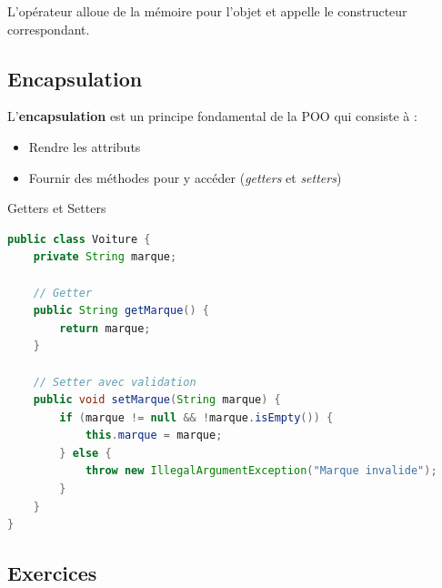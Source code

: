 \begin{remarque}
    L'opérateur  alloue de la mémoire pour l'objet et appelle le constructeur correspondant.
\end{remarque}


\subsection{Encapsulation}

L'\textbf{encapsulation} est un principe fondamental de la POO qui consiste \`a :
\begin{itemize}
    \item Rendre les attributs 
    \item Fournir des méthodes  pour y accéder (\textit{getters} et \textit{setters})
\end{itemize}

\begin{exemple}{Getters et Setters}
\begin{lstlisting}[language=Java]
public class Voiture {
    private String marque;
    
    // Getter
    public String getMarque() {
        return marque;
    }
    
    // Setter avec validation
    public void setMarque(String marque) {
        if (marque != null && !marque.isEmpty()) {
            this.marque = marque;
        } else {
            throw new IllegalArgumentException("Marque invalide");
        }
    }
}
\end{lstlisting}
\end{exemple}


\subsection{Exercices}

